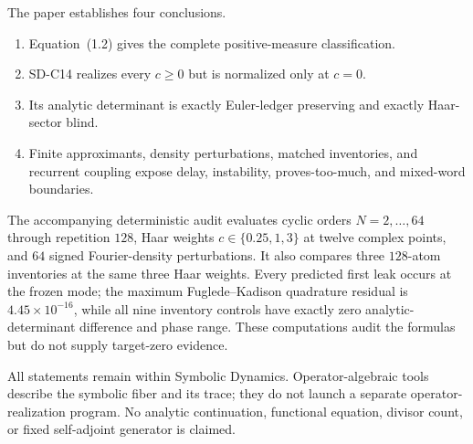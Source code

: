 The paper establishes four conclusions.
\begin{enumerate}
 \item Equation~(1.2) gives the complete positive-measure classification.
 \item SD-C14 realizes every $c\ge0$ but is normalized only at $c=0$.
 \item Its analytic determinant is exactly Euler-ledger preserving and
       exactly Haar-sector blind.
 \item Finite approximants, density perturbations, matched inventories, and
       recurrent coupling expose delay, instability, proves-too-much, and
       mixed-word boundaries.
\end{enumerate}

The accompanying deterministic audit evaluates cyclic orders
$N=2,\ldots,64$ through repetition $128$, Haar weights
$c\in\{0.25,1,3\}$ at twelve complex points, and $64$ signed Fourier-density
perturbations.  It also compares three $128$-atom inventories at the same
three Haar weights.  Every predicted first leak occurs at the frozen mode;
the maximum Fuglede--Kadison quadrature residual is
$4.45\times10^{-16}$, while all nine inventory controls have exactly zero
analytic-determinant difference and phase range.  These computations audit
the formulas but do not supply target-zero evidence.

All statements remain within Symbolic Dynamics.  Operator-algebraic tools
describe the symbolic fiber and its trace; they do not launch a separate
operator-realization program.  No analytic continuation, functional
equation, divisor count, or fixed self-adjoint generator is claimed.
